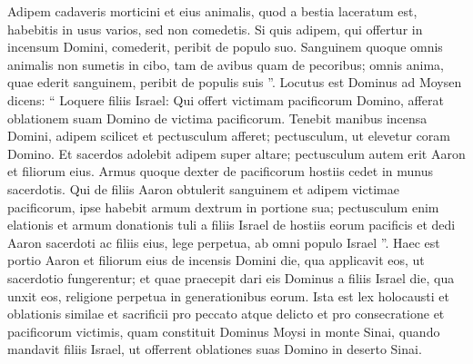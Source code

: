 \begin{biblechapter}
\begin{biblechapter}
\begin{biblechapter}
\begin{biblechapter}
\begin{biblechapter}
\begin{biblechapter}
\begin{biblechapter}
\verse Adipem cadaveris morticini et eius animalis, quod a bestia laceratum est, habebitis in usus varios, sed non comedetis. 
\verse Si quis adipem, qui offertur in incensum Domini, comederit, peribit de populo suo. 
\verse Sanguinem quoque omnis animalis non sumetis in cibo, tam de avibus quam de pecoribus; 
\verse omnis anima, quae ederit sanguinem, peribit de populis suis ”.
 \verse Locutus est Dominus ad Moysen dicens: 
\verse “ Loquere filiis Israel: Qui offert victimam pacificorum Domino, afferat oblationem suam Domino de victima pacificorum. 
\verse Tenebit manibus incensa Domini, adipem scilicet et pectusculum afferet; pectusculum, ut elevetur coram Domino. 
\verse Et sacerdos adolebit adipem super altare; pectusculum autem erit Aaron et filiorum eius. 
 \verse Armus quoque dexter de pacificorum hostiis cedet in munus sacerdotis. 
\verse Qui de filiis Aaron obtulerit sanguinem et adipem victimae pacificorum, ipse habebit armum dextrum in portione sua; 
\verse pectusculum enim elationis et armum donationis tuli a filiis Israel de hostiis eorum pacificis et dedi Aaron sacerdoti ac filiis eius, lege perpetua, ab omni populo Israel ”.
 \verse Haec est portio Aaron et filiorum eius de incensis Domini die, qua applicavit eos, ut sacerdotio fungerentur; 
\verse et quae praecepit dari eis Dominus a filiis Israel die, qua unxit eos, religione perpetua in generationibus eorum.
 \verse Ista est lex holocausti et oblationis similae et sacrificii pro peccato atque delicto et pro consecratione et pacificorum victimis, 
\verse quam constituit Dominus Moysi in monte Sinai, quando mandavit filiis Israel, ut offerrent oblationes suas Domino in deserto Sinai.
 

\end{biblechapter}
\end{biblechapter}
\end{biblechapter}
\end{biblechapter}
\end{biblechapter}
\end{biblechapter}
\end{biblechapter}

